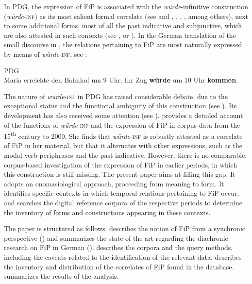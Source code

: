 \documentclass[output=paper,colorlinks,citecolor=brown]{langscibook}
\begin{document}
In PDG, the expression of FiP is associated with the \textit{würde}-infinitive construction (\textit{würde}-\textsc{inf}) as its most salient formal correlate (see \cite{Herdin1903} and \citeyear{Herdin1905}, \cite[35–36]{Petkov1991}, \cite[140–159]{Thieroff1992}, \cite[60–67]{Szatzker2002}, among others), next to some additional forms, most of all the past indicative and subjunctive, which are also attested in such contexts (see \cite[94]{FabriciusHansen2000}, \cite[177–184]{Szatzker2002} or \cite[307]{Welke2005}). In the German translation of the small discourse in , the relations pertaining to FiP are most naturally expressed by means of \textit{würde}-\textsc{inf}, see :


\ea \label{ex:petrova_chen:pdg} PDG \\ Maria erreichte den Bahnhof um 9 Uhr. Ihr Zug \textbf{würde} um 10 Uhr \textbf{kommen}.
\z
{}

The nature of \textit{würde}-\textsc{inf} in PDG has raised considerable debate, due to the exceptional status and the functional ambiguity of this construction (see ). Its development has also received some attention (see ). \citet{Szatzker2002} provides a detailed account of the functions of  \textit{würde}-\textsc{inf} and the expression of FiP in corpus data from the 15\textsuperscript{th} century to 2000. She finds that \textit{würde}-\textsc{inf} is robustly attested as a correlate of FiP in her material, but that it alternates with other expressions, such as the modal verb periphrases and the past indicative. However, there is no comparable, corpus-based investigation of the expression of FiP in earlier periods, in which this construction is still missing. The present paper aims at filling this gap. It adopts an onomasiological approach, proceeding from meaning to form. It identifies specific contexts in which temporal relations pertaining to FiP occur, and searches the digital reference corpora of the respective periods to determine the inventory of forms and constructions appearing in these contexts. 

The paper is structured as follows.  describes the notion of FiP from a synchronic perspective () and summarizes the state of the art regarding the diachronic research on FiP in German ().  describes the corpora and the query methods, including the caveats related to the identification of the relevant data.  describes the inventory and distribution of the correlates of FiP found in the database.  summarizes the results of the analysis.
\end{document}
